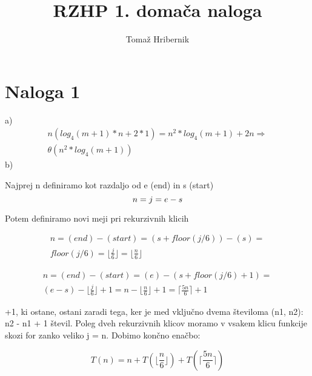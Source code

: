 \documentclass[12pt]{article}
\author{Tomaž Hribernik}
\begin{document}
  \title{RZHP 1. domača naloga}
  \maketitle

  \section*{Naloga 1}
    a)
    \begin{equation}
      \begin{gathered}
        n(log_4(m + 1) * n + 2 * 1) = n^2 * log_4(m + 1) + 2n\Rightarrow\\
        \theta(n^2 * log_4 (m + 1))
      \end{gathered}
    \end{equation}
    b)

    Najprej n definiramo kot razdaljo od e (end) in s (start)
    \begin{equation}
      n = j = e-s\\
    \end{equation}
    
    Potem definiramo novi meji pri rekurzivnih klicih
    
    \begin{equation}
      \begin{gathered}
        n = (end) - (start) = (s + floor(j/6)) - (s) = \\
        floor(j/6) = \lfloor{\frac{j}{6}}\rfloor =
        \lfloor{\frac{n}{6}}\rfloor
      \end{gathered}
    \end{equation}

    \begin{equation}
      \begin{gathered}
        n = (end) - (start) = (e) - (s + floor(j/6) + 1) = \\
        (e - s) - \lfloor{\frac{j}{6}}\rfloor + 1 = n - \lfloor{\frac{n}{6}}\rfloor + 1 = \lceil{\frac{5n}{6}}\rceil + 1
      \end{gathered}
    \end{equation}

    +1, ki ostane, ostani zaradi tega, ker je med vključno dvema številoma (n1, n2): n2 - n1 + 1 števil. Poleg dveh rekurzivnih klicov moramo v vsakem klicu funkcije skozi for zanko veliko j = n. Dobimo končno enačbo:

    \begin{equation}
      T(n) = n + T(\lfloor{\frac{n}{6}}\rfloor) + T(\lceil{\frac{5n}{6}}\rceil)
    \end{equation}
\end{document}
